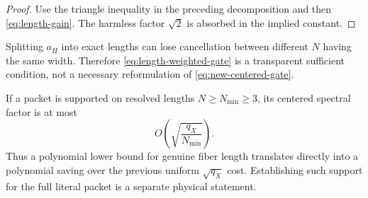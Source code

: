 \begin{proof}
Use the triangle inequality in the preceding decomposition and then
\eqref{eq:length-gain}.  The harmless factor \(\sqrt2\) is absorbed
in the implied constant.
\end{proof}

\begin{remark}
Splitting \(a_H\) into exact lengths can lose cancellation between
different \(N\) having the same width.  Therefore
\eqref{eq:length-weighted-gate} is a transparent sufficient
condition, not a necessary reformulation of
\eqref{eq:new-centered-gate}.
\end{remark}

\begin{remark}
If a packet is supported on resolved lengths
\(N\ge N_{\min}\ge3\), its centered spectral factor is at most
\[
 O\!\left(\sqrt{\frac{q_X}{N_{\min}}}\right).
\]
Thus a polynomial lower bound for genuine fiber length translates
directly into a polynomial saving over the previous uniform
\(\sqrt{q_X}\) cost.  Establishing such support for the full literal
packet is a separate physical statement.
\end{remark}
